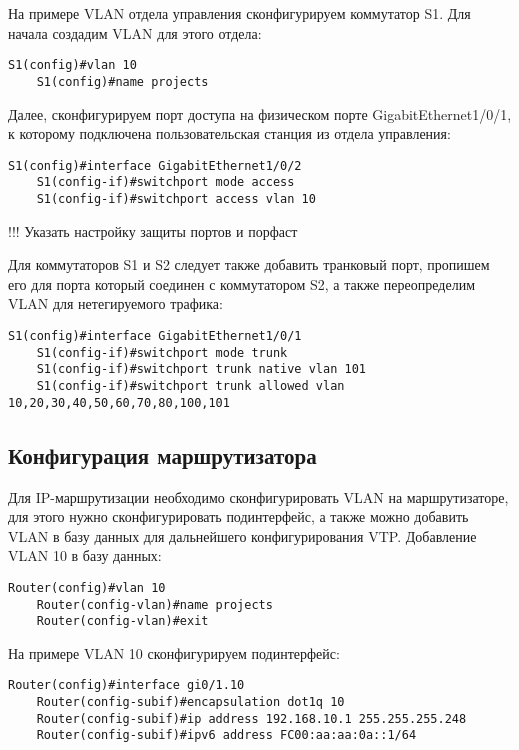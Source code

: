 На примере VLAN отдела управления сконфигурируем коммутатор S1. Для начала создадим 
VLAN для этого отдела:

\begin{lstlisting}[xleftmargin=-2.5em]
    S1(config)#vlan 10
    S1(config)#name projects
\end{lstlisting}

Далее, сконфигурируем порт доступа на физическом порте GigabitEthernet1/0/1, к которому подключена пользовательская
станция из отдела управления:

\begin{lstlisting}[xleftmargin=-2.5em]
    S1(config)#interface GigabitEthernet1/0/2
    S1(config-if)#switchport mode access
    S1(config-if)#switchport access vlan 10
\end{lstlisting}

!!! Указать настройку защиты портов и порфаст

Для коммутаторов S1 и S2 следует также добавить транковый порт, пропишем его для порта который соединен с коммутатором S2,
а также переопределим VLAN для нетегируемого трафика:

\begin{lstlisting}[xleftmargin=-2.5em]
    S1(config)#interface GigabitEthernet1/0/1
    S1(config-if)#switchport mode trunk
    S1(config-if)#switchport trunk native vlan 101
    S1(config-if)#switchport trunk allowed vlan 10,20,30,40,50,60,70,80,100,101
\end{lstlisting}


\subsection{Конфигурация маршрутизатора}

Для IP-маршрутизации необходимо сконфигурировать VLAN на маршрутизаторе, для этого нужно сконфигурировать
подинтерфейс, а также можно добавить VLAN в базу данных для дальнейшего конфигурирования VTP.
Добавление VLAN 10 в базу данных:
\begin{lstlisting}[xleftmargin=-2.5em]
    Router(config)#vlan 10
    Router(config-vlan)#name projects
    Router(config-vlan)#exit
\end{lstlisting}

На примере VLAN 10 сконфигурируем подинтерфейс:

\begin{lstlisting}[xleftmargin=-2.5em]
    Router(config)#interface gi0/1.10
    Router(config-subif)#encapsulation dot1q 10
    Router(config-subif)#ip address 192.168.10.1 255.255.255.248
    Router(config-subif)#ipv6 address FC00:aa:aa:0a::1/64
\end{lstlisting}

